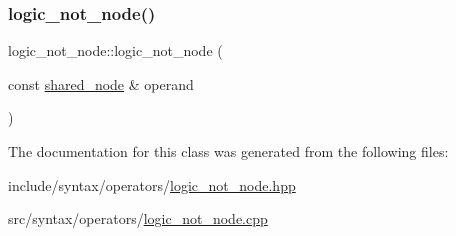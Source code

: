 \subsubsection{\texorpdfstring{logic\+\_\+not\+\_\+node()}{logic\_not\_node()}}
{\footnotesize\ttfamily logic\+\_\+not\+\_\+node\+::logic\+\_\+not\+\_\+node (\begin{DoxyParamCaption}\item[{const \hyperlink{namespacejawe_a3f307481d921b6cbb50cc8511fc2b544}{shared\+\_\+node} \&}]{operand }\end{DoxyParamCaption})}



The documentation for this class was generated from the following files\+:\begin{DoxyCompactItemize}
\item 
include/syntax/operators/\hyperlink{logic__not__node_8hpp}{logic\+\_\+not\+\_\+node.\+hpp}\item 
src/syntax/operators/\hyperlink{logic__not__node_8cpp}{logic\+\_\+not\+\_\+node.\+cpp}\end{DoxyCompactItemize}
